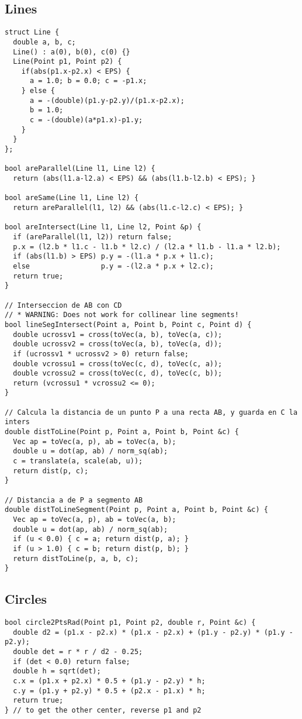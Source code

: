 \documentclass[11pt, oneside]{article}
\begin{document}
\subsection{Lines}
\begin{lstlisting}
struct Line {
  double a, b, c;
  Line() : a(0), b(0), c(0) {}
  Line(Point p1, Point p2) {
    if(abs(p1.x-p2.x) < EPS) {
      a = 1.0; b = 0.0; c = -p1.x;
    } else {
      a = -(double)(p1.y-p2.y)/(p1.x-p2.x);
      b = 1.0;
      c = -(double)(a*p1.x)-p1.y;
    }
  }
};

bool areParallel(Line l1, Line l2) {
  return (abs(l1.a-l2.a) < EPS) && (abs(l1.b-l2.b) < EPS); }

bool areSame(Line l1, Line l2) {
  return areParallel(l1, l2) && (abs(l1.c-l2.c) < EPS); }

bool areIntersect(Line l1, Line l2, Point &p) {
  if (areParallel(l1, l2)) return false;
  p.x = (l2.b * l1.c - l1.b * l2.c) / (l2.a * l1.b - l1.a * l2.b);
  if (abs(l1.b) > EPS) p.y = -(l1.a * p.x + l1.c);
  else                 p.y = -(l2.a * p.x + l2.c);
  return true;
}

// Interseccion de AB con CD
// * WARNING: Does not work for collinear line segments!
bool lineSegIntersect(Point a, Point b, Point c, Point d) {
  double ucrossv1 = cross(toVec(a, b), toVec(a, c));
  double ucrossv2 = cross(toVec(a, b), toVec(a, d));
  if (ucrossv1 * ucrossv2 > 0) return false;
  double vcrossu1 = cross(toVec(c, d), toVec(c, a));
  double vcrossu2 = cross(toVec(c, d), toVec(c, b));
  return (vcrossu1 * vcrossu2 <= 0);
}

// Calcula la distancia de un punto P a una recta AB, y guarda en C la inters
double distToLine(Point p, Point a, Point b, Point &c) {
  Vec ap = toVec(a, p), ab = toVec(a, b);
  double u = dot(ap, ab) / norm_sq(ab);
  c = translate(a, scale(ab, u));
  return dist(p, c);
}

// Distancia a de P a segmento AB
double distToLineSegment(Point p, Point a, Point b, Point &c) {
  Vec ap = toVec(a, p), ab = toVec(a, b);
  double u = dot(ap, ab) / norm_sq(ab);
  if (u < 0.0) { c = a; return dist(p, a); }
  if (u > 1.0) { c = b; return dist(p, b); }
  return distToLine(p, a, b, c);
}
\end{lstlisting}

\subsection{Circles}
\begin{lstlisting}
bool circle2PtsRad(Point p1, Point p2, double r, Point &c) {
  double d2 = (p1.x - p2.x) * (p1.x - p2.x) + (p1.y - p2.y) * (p1.y - p2.y);
  double det = r * r / d2 - 0.25;
  if (det < 0.0) return false;
  double h = sqrt(det);
  c.x = (p1.x + p2.x) * 0.5 + (p1.y - p2.y) * h;
  c.y = (p1.y + p2.y) * 0.5 + (p2.x - p1.x) * h;
  return true;
} // to get the other center, reverse p1 and p2
\end{lstlisting}
\end{document}
